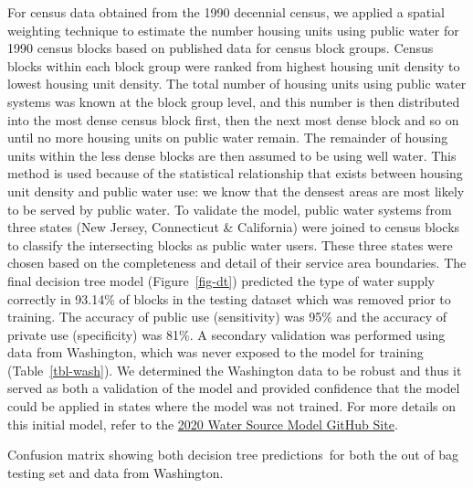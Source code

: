 \documentclass[12pt]{article}
\begin{document}
For census data obtained from the 1990 decennial census, we applied a
spatial weighting technique to estimate the number housing units using
public water for 1990 census blocks based on published data for census
block groups. Census blocks within each block group were ranked from
highest housing unit density to lowest housing unit density. The total
number of housing units using public water systems was known at the
block group level, and this number is then distributed into the most
dense census block first, then the next most dense block and so on until
no more housing units on public water remain. The remainder of housing
units within the less dense blocks are then assumed to be using well
water. This method is used because of the statistical relationship that
exists between housing unit density and public water use: we know that
the densest areas are most likely to be served by public water. To
validate the model, public water systems from three states (New Jersey,
Connecticut \& California) were joined to census blocks to classify the
intersecting blocks as public water users. These three states were
chosen based on the completeness and detail of their service area
boundaries. The final decision tree model (Figure~\ref{fig-dt})
predicted the type of water supply correctly in 93.14\% of blocks in the
testing dataset which was removed prior to training. The accuracy of
public use (sensitivity) was 95\% and the accuracy of private use
(specificity) was 81\%. A secondary validation was performed using data
from Washington, which was never exposed to the model for training
(Table~\ref{tbl-wash}). We determined the Washington data to be robust
and thus it served as both a validation of the model and provided
confidence that the model could be applied in states where the model was
not trained. For more details on this initial model, refer to the
\href{https://github.com/USEPA/ORD_Water_Source_2020}{2020 Water Source
Model GitHub Site}.

\begin{table}

\caption{\label{tbl-wash}Confusion matrix showing both decision tree
predictions~for both the out of bag testing set and data from
Washington.}


\end{table}%
\end{document}

